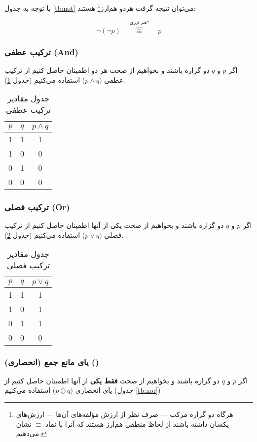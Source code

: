\documentclass[a4paper]{article}
\begin{document}
با توجه به جدول \ref{tb:not} می‌توان نتیجه گرفت هردو هم‌ارز\footnote{هرگاه دو گزاره مرکب --- صرف نظر از ارزش مؤلفه‌های آن‌ها --- ارزش‌های یکسان داشته باشند از لحاظ منطقی هم‌ارز هستند که آنرا با نماد \(\equiv\) نشان می‌دهیم.} هستند:

\begin{equation}
\lnot(\lnot p) \quad \overbrace{\equiv}^{\text{هم ارزی*}} \quad p
\end{equation}

\subsubsection{ترکیب عطفی (And)}
\label{sec:org8eb1e74}
اگر \(p\) و \(q\) دو گزاره باشند و بخواهیم از صحت هر دو اطمینان حاصل کنیم از ترکیب عطفی (\(p \land q\)) استفاده می‌کنیم (جدول \ref{tb:and}).

\begin{table}[htbp]
\caption{\label{tb:and}جدول مقادیر ترکیب عطفی}
\centering
\begin{tabular}{cc|c}
\(p\) & \(q\) & \(p \land q\)\\
\hline
1 & 1 & 1\\
1 & 0 & 0\\
0 & 1 & 0\\
0 & 0 & 0\\
\end{tabular}
\end{table}

\subsubsection{ترکیب فصلی (Or)}
\label{sec:org567e61f}
اگر \(p\) و \(q\) دو گزاره باشند و بخواهیم از صحت یکی از آنها اطمینان حاصل کنیم از ترکیب فصلی (\(p \lor q\)) استفاده می‌کنیم (جدول \ref{tb:or}).

\begin{table}[htbp]
\caption{\label{tb:or}جدول مقادیر ترکیب فصلی}
\centering
\begin{tabular}{cc|c}
\(p\) & \(q\) & \(p \lor q\)\\
\hline
1 & 1 & 1\\
1 & 0 & 1\\
0 & 1 & 1\\
0 & 0 & 0\\
\end{tabular}
\end{table}

\subsubsection{یای مانع جمع (انحصاری) ()}
\label{sec:orgedfc68c}
اگر \(p\) و \(q\) دو گزاره باشند و بخواهیم از صحت \textbf{فقط یکی} از آنها اطمینان حاصل کنیم از یای انحصاری (\(p \oplus q\)) استفاده می‌کنیم (جدول \ref{tb:xor})
\end{document}
